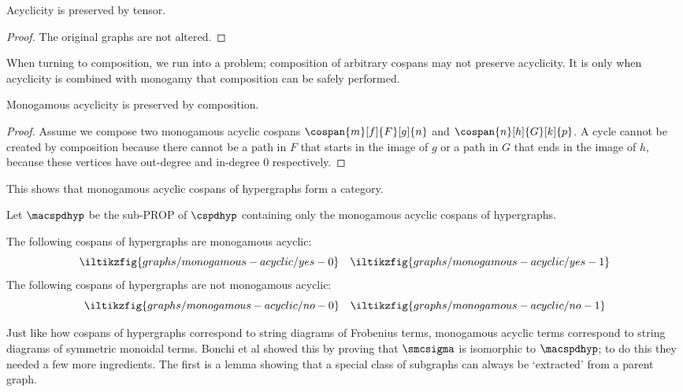 \begin{lemma}\label{lem:monogamous-acyclicity-preserved-tensor}
    Acyclicity is preserved by tensor.
\end{lemma}
\begin{proof}
    The original graphs are not altered.
\end{proof}

When turning to composition, we run into a problem; composition of arbitrary
cospans may not preserve acyclicity.
It is only when acyclicity is combined with monogamy that composition can be
safely performed.

\begin{lemma}\label{lem:monogamous-acyclicity-preserved-composition}
    Monogamous acyclicity is preserved by composition.
\end{lemma}
\begin{proof}
    Assume we compose two monogamous acyclic cospans \(
    \cospan{m}[f]{F}[g]{n}
    \) and \(
    \cospan{n}[h]{G}[k]{p}
    \).
    A cycle cannot be created by composition because there cannot be a path in
    \(F\) that starts in the image of \(g\) or a path in \(G\) that ends in the
    image of \(h\), because these vertices have out-degree and in-degree \(0\)
    respectively.
\end{proof}

This shows that monogamous acyclic cospans of hypergraphs form a category.

\begin{definition}
    Let \(\macspdhyp\) be the sub-PROP of \(\cspdhyp\) containing only the
    monogamous acyclic cospans of hypergraphs.
\end{definition}

\begin{example}\label{ex:monogamous-acyclic}
    The following cospans of hypergraphs are monogamous acyclic:
    \[
        \iltikzfig{graphs/monogamous-acyclic/yes-0}
        \quad
        \iltikzfig{graphs/monogamous-acyclic/yes-1}
    \]
    The following cospans of hypergraphs are not monogamous acyclic:
    \[
        \iltikzfig{graphs/monogamous-acyclic/no-0}
        \quad
        \iltikzfig{graphs/monogamous-acyclic/no-1}
    \]
\end{example}

Just like how cospans of hypergraphs correspond to string diagrams of Frobenius
terms, monogamous acyclic terms correspond to string diagrams of symmetric
monoidal terms.
Bonchi et al showed this by proving that \(\smcsigma\) is isomorphic to
\(\macspdhyp\); to do this they needed a few more ingredients.
The first is a lemma showing that a special class of subgraphs can always be
`extracted' from a parent graph.


